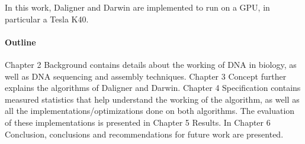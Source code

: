 \documentclass[../main/thesis.tex]{subfiles}
\begin{document}
In this work, Daligner and Darwin are implemented to run on a GPU, in particular a Tesla K40.

\paragraph{Outline}
Chapter 2 Background contains details about the working of DNA in biology, as well as DNA sequencing and assembly techniques.
Chapter 3 Concept further explains the algorithms of Daligner and Darwin.
Chapter 4 Specification contains measured statistics that help understand the working of the algorithm, as well as all the implementations/optimizations done on both algorithms.
The evaluation of these implementations is presented in Chapter 5 Results.
In Chapter 6 Conclusion, conclusions and recommendations for future work are presented.
\end{document}
